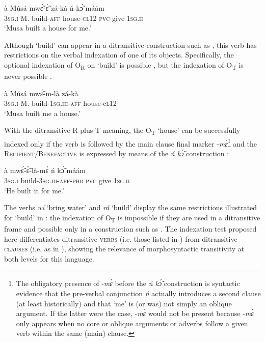 \documentclass[output=paper]{langsci/langscibook}
\begin{document}
\ea
\label{ex:6.pacchiarotti}
\gll à    Músá  mwɛ̃́-ɛ̃̀    zá-kà    ń  kɔ̃́  máám \\
\textsc{3sg.i}    M.  build-\textsc{aff}  house\textsc{-cl12}  \textsc{pvc}  give  \textsc{1sg.ii}\\
\glt`Musa built a house for me.'
\z

Although `build' can appear in a ditransitive construction such as , this verb has restrictions on the verbal indexation of one of its objects. Specifically, the optional indexation of O\textsubscript{R} on `build' is possible , but the indexation of O\textsubscript{T} is never possible .

\ea
\label{ex:7.pacchiarotti}
\gll à    Músá  mwɛ̃́-m-là    zá-kà\\
\textsc{3sg.i}    M.  build-\textsc{1sg.iii-aff}  house-c\textsc{l12}\\
\glt `Musa built me a house.'
\z
 
\z


With the ditransitive R plus T meaning, the O\textsubscript{T} `house' can be successfully indexed only if the verb is followed by the main clause final marker -\textit{m\`{ɛ}}\footnote{The obligatory presence of -\textit{m\`{ɛ}} before the \textit{ń k\'{\~{ɔ}}} construction is syntactic evidence that the pre-verbal conjunction \textit{ń} actually introduces a second clause (at least historically) and that `me' is (or was) not simply an oblique argument. If the latter were the case, -\textit{m\`{ɛ}} would not be present because -\textit{m\`{ɛ}} only appears when no core or oblique arguments or adverbs follow a given verb within the same (main) clause.}{} and the \textsc{Recipient/Benefactive} is expressed by means of the \textit{ń k\'{\~{ɔ}}} construction :

\ea
\label{ex:9.pacchiarotti}
\gll à    mwɛ̃́-ɛ̃̀-là-mɛ̀      ń  kɔ̃́  máám \\
\textsc{3sg.i}    build-\textsc{3sg.iii-aff-phb}  \textsc{pvc}  give \textsc{  1sg.ii} \\
\glt `He built it for me.'
\z

The verbs \textit{wí} `bring water' and \textit{rá} `build' display the same restrictions illustrated for `build' in : the indexation of O\textsubscript{T} is impossible if they are used in a ditransitive frame and possible only in a construction such as . The indexation test proposed here differentiates ditransitive \textsc{verbs} (i.e. those listed in ) from ditransitive \textsc{clauses} (i.e. as in ), showing the relevance of morphosyntactic transitivity at both levels for this language.
\end{document}
